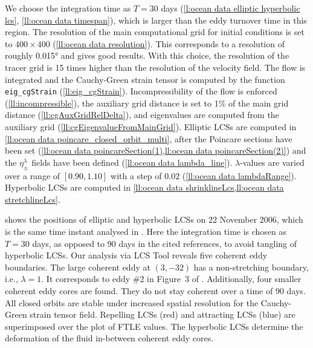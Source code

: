 \documentclass[5p]{elsarticle}
\begin{document}
We choose the integration time as $T=30$ days (\cref{l:ocean data elliptic hyperbolic lcs}, \cref{ll:ocean data timespan}), which is larger than the eddy turnover time in this region. The resolution of the main computational grid for initial conditions is set to $400 \times 400$ (\cref{ll:ocean data resolution}). This corresponds to a resolution of roughly 0.015° and gives good results. With this choice, the resolution of the tracer grid is 15 times higher than the resolution of the velocity field. The flow is integrated and the Cauchy-Green strain tensor is computed by the function \lstinline!eig_cgStrain! (\cref{ll:eig_cgStrain}). Incompressibility of the flow is enforced (\cref{ll:incompressible}), the auxiliary grid distance is set to 1\% of the main grid distance (\cref{ll:cgAuxGridRelDelta}), and eigenvalues are computed from the auxiliary grid (\cref{ll:cgEigenvalueFromMainGrid}). Elliptic LCSs are computed in \cref{ll:ocean data poincare_closed_orbit_multi}, after the Poincare sections have been set (\cref{ll:ocean data poincareSection(1),ll:ocean data poincareSection(2)}) and the $\eta_\pm^\lambda$ fields have been defined (\cref{ll:ocean data lambda_line}). $\lambda$-values are varied over a range of $[0.90,1.10]$ with a step of $0.02$ (\cref{ll:ocean data lambdaRange}). Hyperbolic LCSs are computed in \cref{ll:ocean data shrinklineLcs,ll:ocean data stretchlineLcs}.

 shows the positions of elliptic and hyperbolic LCSs on 22 November 2006, which is the same time instant analysed in \citet{haller13:_coher_lagran,haller14:_adden_coher_lagran,beron-vera13:_objec_agulh}. Here the integration time is chosen as $T = 30$ days, as opposed to 90 days in the cited references, to avoid tangling of hyperbolic LCSs. Our analysis via LCS Tool reveals five coherent eddy boundaries. The large coherent eddy at $(3,-32)$ has a non-stretching boundary, i.e., $\lambda = 1$. It corresponds to eddy \#2 in Figure~3 of \citet{beron-vera13:_objec_agulh}. Additionally, four smaller coherent eddy cores are found. They do not stay coherent over a time of 90 days. All closed orbits are stable under increased spatial resolution for the Cauchy-Green strain tensor field. Repelling LCSs (red) and attracting LCSs (blue) are superimposed over the plot of FTLE values. The hyperbolic LCSs determine the deformation of the fluid in-between coherent eddy cores.
\end{document}
